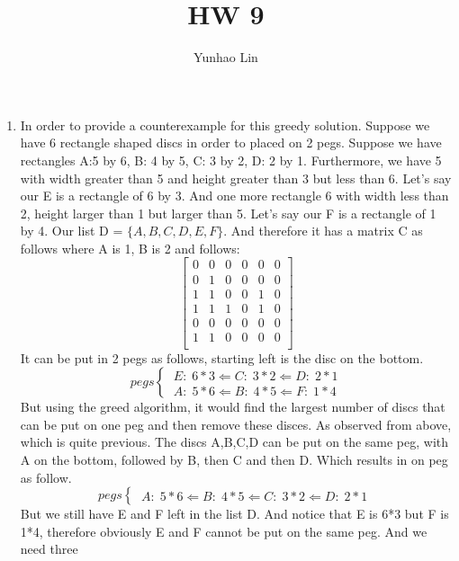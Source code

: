 \documentclass[14pt]{article}
\title{HW 9}
\author{Yunhao Lin}
\begin{document}
\maketitle

\begin{enumerate}
\item In order to provide a counterexample for this greedy solution. Suppose we
have 6 rectangle shaped discs in order to placed on 2 pegs. Suppose we have
rectangles A:5 by 6, B: 4 by 5, C: 3 by 2, D: 2 by 1. Furthermore, we have 5 with
width greater than 5 and height greater than 3 but less than 6.
Let's say our E is a rectangle of 6 by 3. And one more rectangle 6 with width less
than 2, height larger than 1 but larger than 5. Let's say our F is a rectangle
of 1 by 4. Our list D = $\{A,B,C,D,E,F\}$.
And therefore it has a matrix C as follows where A is 1, B is 2 and follows:
\[
\begin{bmatrix}
    0 & 0 & 0 & 0 & 0 & 0\\
    0 & 1 & 0 & 0 & 0 & 0\\
    1 & 1 & 0 & 0 & 1 & 0\\
    1 & 1 & 1 & 0 & 1 & 0\\
    0 & 0 & 0 & 0 & 0 & 0\\
    1 & 1 & 0 & 0 & 0 & 0\\
\end{bmatrix}\]
 It can be put in 2 pegs as follows, starting left is the disc on the bottom.
 \[
    pegs  \left\{
                \begin{array}{ll}
                    \ E:\;6*3 \Leftarrow C:\;3*2 \Leftarrow D:\;2*1 \\
                    \ A:\;5*6 \Leftarrow B:\;4*5 \Leftarrow F:\;1*4
                \end{array}
              \right.
    \]
But using the greed algorithm, it would find the largest number of discs that 
can be put on one peg and then remove these disces. As observed from above, which
is quite previous. The discs A,B,C,D can be put on the same peg, with A on the bottom,
followed by B, then C and then D. Which results in  on peg as follow. 
\[
    pegs  \left\{
                \begin{array}{ll}
                    \ A:\;5*6 \Leftarrow B:\;4*5 \Leftarrow C:\;3*2 \Leftarrow D:\;2*1 
                    \   
                \end{array}
              \right.
    \]
But we still have E and F left in the list D. And notice that E is 6*3 but F is
1*4, therefore obviously E and F cannot be put on the same peg. And we need three

\end{enumerate}
\end{document}
